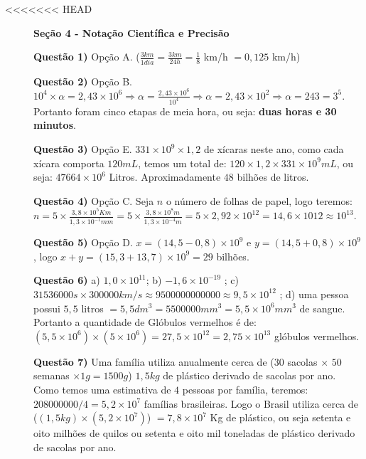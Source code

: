 \begin{description}
\item[{\textless{}\textless{}\textless{}\textless{}\textless{}\textless{}\textless{} HEAD}] \leavevmode
\textbf{Seção 4 - Notação Científica e Precisão}

\textbf{Questão 1)} Opção A.  (\(\frac{3km}{1dia}=\frac{3km}{24h}=\frac{1}{8}\) km/h \(=0,125\) km/h)

\textbf{Questão 2)} Opção B. \(10^{4} \times \alpha = 2,43 \times 10^{6} \Rightarrow \alpha = \frac{2,43 \times 10^{6}}{10^{4}} \Rightarrow \alpha = 2,43 \times 10^{2} \Rightarrow \alpha = 243 = 3^{5}\). Portanto foram cinco etapas de meia hora, ou seja: \textbf{duas horas e 30 minutos}.

\textbf{Questão 3)} Opção E. \(331 \times 10^{9} \times 1,2\) de xícaras neste ano, como cada xícara comporta \(120mL\), temos um total de: \(120 \times 1,2 \times 331 \times 10^{9}mL\), ou seja: \(47664 \times 10^{6}\) Litros. Aproximadamente \(48\) bilhões de litros.

\textbf{Questão 4)} Opção C. Seja \(n\) o número de folhas de papel, logo teremos: \(n = 5 \times \frac{3,8 \times 10^{5} Km}{1,3 \times 10^{-1}mm} = 5 \times \frac{3,8 \times 10^{8} m}{1,3 \times 10^{-4}m}= 5 \times 2,92 \times 10^{12} = 14,6 \times 10{12} \approx 10^{13}.\)

\textbf{Questão 5)} Opção D. \(x = (14,5 - 0,8) \times 10^{9}\) e \(y = (14,5 + 0,8) \times 10^{9}\), logo \(x+y=(15,3 + 13,7) \times 10^{9} = 29\) bilhões.

\textbf{Questão 6)} a) \(1,0 \times 10^{11}\); b) \(-1,6 \times 10^{-19}\) ;             c) \(31536000s \times 300 000 km/s \approx 9 500 000 000 000 \approx 9,5 \times 10^{12}\) ;  d) uma pessoa possui \(5,5\) litros \(= 5,5 dm^{3} = 5500000 mm^{3} = 5,5 \times 10^{6} mm^{3}\) de sangue. Portanto a quantidade de Glóbulos vermelhos é de: \((5,5 \times 10^{6}) \times (5 \times 10^{6}) = 27,5 \times 10^{12} = 2,75 \times 10^{13}\) glóbulos vermelhos.

\textbf{Questão 7)} Uma família utiliza anualmente cerca de (\(30\) sacolas \(\times\) \(50\) semanas \(\times 1g = 1500g\)) \(1,5kg\) de plástico derivado de sacolas por ano. Como temos uma estimativa de \(4\) pessoas por família, teremos: \(208000000/4 = 5,2 \times 10^{7}\) famílias brasileiras. Logo o Brasil utiliza cerca de (\((1,5kg) \times (5,2 \times 10^{7})\)) \(= 7,8 \times 10^{7}\) Kg de plástico, ou seja setenta e oito milhões de quilos ou  setenta e oito mil toneladas de plástico derivado de sacolas por ano.

\end{description}
